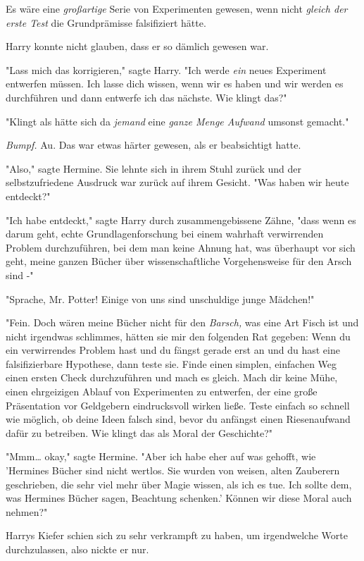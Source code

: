 {Es wäre eine \emph{großartige} Serie von Experimenten gewesen, wenn nicht \emph{gleich der erste Test} die Grundprämisse falsifiziert hätte.

Harry konnte nicht glauben, dass er so dämlich gewesen war.

"Lass mich das korrigieren," sagte Harry. "Ich werde \emph{ein} neues Experiment entwerfen müssen. Ich lasse dich wissen, wenn wir es haben und wir werden es durchführen und dann entwerfe ich das nächste. Wie klingt das?"

"Klingt als hätte sich da \emph{jemand} eine \emph{ganze Menge Aufwand} umsonst gemacht."

\emph{Bumpf.} Au. Das war etwas härter gewesen, als er beabsichtigt hatte.

"Also," sagte Hermine. Sie lehnte sich in ihrem Stuhl zurück und der selbstzufriedene Ausdruck war zurück auf ihrem Gesicht. "Was haben wir heute entdeckt?"

"Ich habe entdeckt," sagte Harry durch zusammengebissene Zähne, "dass wenn es darum geht, echte Grundlagenforschung bei einem wahrhaft verwirrenden Problem durchzuführen, bei dem man keine Ahnung hat, was überhaupt vor sich geht, meine ganzen Bücher über wissenschaftliche Vorgehensweise für den Arsch sind -"

"Sprache, Mr. Potter! Einige von uns sind unschuldige junge Mädchen!"

"Fein. Doch wären meine Bücher nicht für den \emph{Barsch,} was eine Art Fisch ist und nicht irgendwas schlimmes, hätten sie mir den folgenden Rat gegeben: Wenn du ein verwirrendes Problem hast und du fängst gerade erst an und du hast eine falsifizierbare Hypothese, dann teste sie. Finde einen simplen, einfachen Weg einen ersten Check durchzuführen und mach es gleich. Mach dir keine Mühe, einen ehrgeizigen Ablauf von Experimenten zu entwerfen, der eine große Präsentation vor Geldgebern eindrucksvoll wirken ließe. Teste einfach so schnell wie möglich, ob deine Ideen falsch sind, bevor du anfängst einen Riesenaufwand dafür zu betreiben. Wie klingt das als Moral der Geschichte?"

"Mmm… okay," sagte Hermine. "Aber ich habe eher auf was gehofft, wie 'Hermines Bücher sind nicht wertlos. Sie wurden von weisen, alten Zauberern geschrieben, die sehr viel mehr über Magie wissen, als ich es tue. Ich sollte dem, was Hermines Bücher sagen, Beachtung schenken.' Können wir diese Moral auch nehmen?"

Harrys Kiefer schien sich zu sehr verkrampft zu haben, um irgendwelche Worte durchzulassen, also nickte er nur.

}
